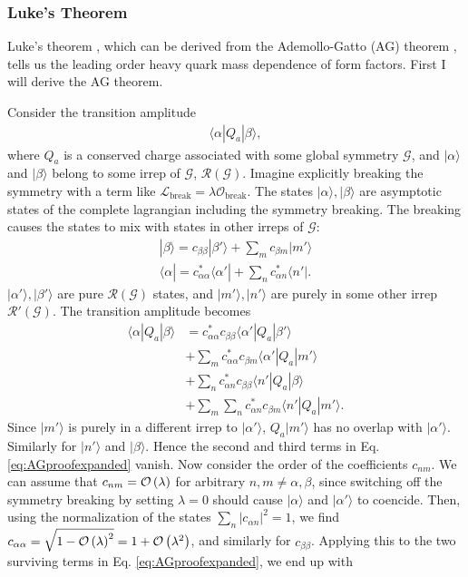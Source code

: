 \subsubsection{Luke's Theorem}
\label{sec:Luke}

Luke's theorem \cite{LUKE1990447}, which can be derived from the Ademollo-Gatto (AG) theorem \cite{PhysRevLett.13.264}, tells us the leading order heavy quark mass dependence of form factors. First I will derive the AG theorem.

Consider the transition amplitude
\begin{align}
  \langle \alpha | Q_a | \beta \rangle,
\end{align}
where $Q_a$ is a conserved charge associated with some global symmetry $\mathcal{G}$, and $|\alpha\rangle$ and $|\beta\rangle$ belong to some irrep of $\mathcal{G}$, $\mathcal{R}(\mathcal{G})$. Imagine explicitly breaking the symmetry with a term like $\mathscr{L}_{\text{break}} = \lambda \mathcal{O}_{\text{break}}$. The states $|\alpha\rangle,|\beta\rangle$ are asymptotic states of the complete lagrangian including the symmetry breaking. The breaking causes the states to mix with states in other irreps of $\mathcal{G}$:
\begin{align}
  |\beta \rangle = c_{\beta\beta} | \beta' \rangle + \sum_{m} c_{\beta m} | m' \rangle \\
  \langle \alpha | = c^*_{\alpha\alpha} \langle \alpha' | + \sum_{n} c^*_{\alpha n} \langle n' |.
\end{align}
$|\alpha'\rangle,|\beta'\rangle$ are pure $\mathcal{R}(\mathcal{G})$ states, and $|m'\rangle,|n'\rangle$ are purely in some other irrep $\mathcal{R}'(\mathcal{G})$. The transition amplitude becomes
\begin{align}
  \nonumber
  \langle \alpha | Q_a | \beta \rangle
  &= c_{\alpha\alpha}^* c_{\beta\beta} \langle \alpha' | Q_a | \beta' \rangle \\
  \nonumber
  &+ \sum_m c_{\alpha\alpha}^* c_{\beta m} \langle \alpha' | Q_a | m' \rangle \\
  \nonumber
  &+ \sum_n c_{\alpha n}^* c_{\beta \beta} \langle n' | Q_a | \beta \rangle \\
  &+ \sum_m\sum_n c_{\alpha n}^* c_{\beta m} \langle n' | Q_a | m' \rangle.
  \label{eq:AGproofexpanded}
\end{align}
Since $|m'\rangle$ is purely in a different irrep to $|\alpha'\rangle$, $Q_a|m'\rangle$ has no overlap with $|\alpha'\rangle$. Similarly for $|n'\rangle$ and $|\beta\rangle$. Hence the second and third terms in Eq. \ref{eq:AGproofexpanded} vanish. Now consider the order of the coefficients $c_{nm}$. We can assume that $c_{nm} = \mathcal{O}\left( \lambda \right)$ for arbitrary $n,m \neq \alpha,\beta$, since switching off the symmetry breaking by setting $\lambda=0$ should cause $|\alpha\rangle $ and $|\alpha'\rangle$ to coencide. Then, using the normalization of the states $\sum_{n} |c_{\alpha n} |^2 = 1$, we find $c_{\alpha\alpha} = \sqrt{1 - \mathcal{O}\left( \lambda \right)^2} = 1 + \mathcal{O}\left( \lambda^2 \right)$, and similarly for $c_{\beta\beta}$. Applying this to the two surviving terms in Eq. \eqref{eq:AGproofexpanded}, we end up with
